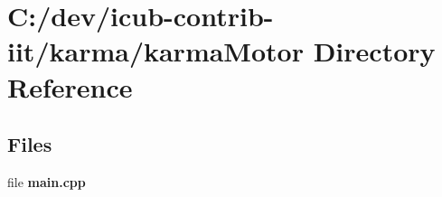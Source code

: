 \section{C\+:/dev/icub-\/contrib-\/iit/karma/karma\+Motor Directory Reference}
\label{dir_fdaf158827427ad707024e7f17bb0c99}
\subsection*{Files}
\begin{DoxyCompactItemize}
\item 
file {\bfseries main.\+cpp}
\end{DoxyCompactItemize}
